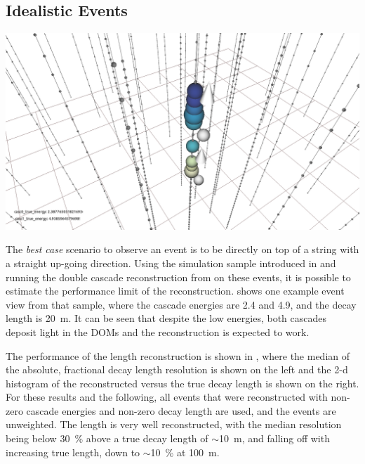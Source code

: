 \subsection{Idealistic Events}

\begin{marginfigure}
    \centering
    \includegraphics[trim=270 40 225 35, clip]{figures/model_independent_simulation/upgoing_e0_2.4_e1_4.9_v2.png}
    \caption[]{}
\end{marginfigure}

The \textit{best case} scenario to observe an event is to be directly on top of a string with a straight up-going direction. Using the simulation sample introduced in  and running the double cascade reconstruction from  on these events, it is possible to estimate the performance limit of the reconstruction.  shows one example event view from that sample, where the cascade energies are \SI{2.4}{\gev} and \SI{4.9}{\gev}, and the decay length is \SI{20}{\meter}. It can be seen that despite the low energies, both cascades deposit light in the DOMs and the reconstruction is expected to work.

The performance of the length reconstruction is shown in , where the median of the absolute, fractional decay length resolution is shown on the left and the 2-d histogram of the reconstructed versus the true decay length is shown on the right. For these results and the following, all events that were reconstructed with non-zero cascade energies and non-zero decay length are used, and the events are unweighted. The length is very well reconstructed, with the median resolution being below \SI{30}{\percent} above a true decay length of $\sim$\SI{10}{\meter}, and falling off with increasing true length, down to $\sim$\SI{10}{\percent} at \SI{100}{\meter}.

